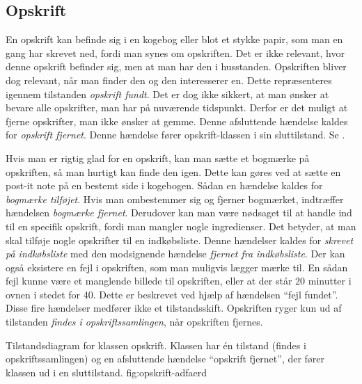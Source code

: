 \subsection{Opskrift}
En opskrift kan befinde sig i en kogebog eller blot et stykke papir, som man en gang har skrevet ned, fordi man synes om opskriften. Det er ikke relevant, hvor denne opskrift befinder sig, men at man har den i husstanden. Opskriften bliver dog relevant, når man finder den og den interesserer en. Dette repræsenteres igennem tilstanden \textit{opskrift fundt}. Det er dog ikke sikkert, at man ønsker at bevare alle opskrifter, man har på nuværende tidspunkt. Derfor er det muligt at fjerne opskrifter, man ikke ønsker at gemme. Denne afsluttende hændelse kaldes for \textit{opskrift fjernet}. Denne hændelse fører opskrift-klassen i sin sluttilstand. Se .

Hvis man er rigtig glad for en opskrift, kan man sætte et bogmærke på opskriften, så man hurtigt kan finde den igen. Dette kan \fx gøres ved at sætte en post-it note på en bestemt side i kogebogen. Sådan en hændelse kaldes for \textit{bogmærke tilføjet}. Hvis man ombestemmer sig og fjerner bogmærket, indtræffer hændelsen \textit{bogmærke fjernet}. Derudover kan man være nødsaget til at handle ind til en specifik opskrift, fordi man mangler nogle ingredienser. Det betyder, at man skal tilføje nogle opskrifter til en indkøbsliste. Denne hændelser kaldes for \textit{skrevet på indkøbsliste} med den modsignende hændelse \textit{fjernet fra indkøbsliste}. Der kan også eksistere en fejl i opskriften, som man muligvis lægger mærke til. En sådan fejl kunne være et manglende billede til opskriften, eller at der står 20 minutter i ovnen i stedet for 40. Dette er beskrevet ved hjælp af hændelsen ``fejl fundet''. Disse fire hændelser medfører ikke et tilstandsskift. Opskriften ryger kun ud af tilstanden \textit{findes i opskriftssamlingen}, når opskriften fjernes.

  {Tilstandsdiagram for klassen opskrift. Klassen har én tilstand (findes i opskriftssamlingen) og en afsluttende hændelse ``opskrift fjernet'', der fører klassen ud i en sluttilstand.}
  {fig:opskrift-adfaerd}
